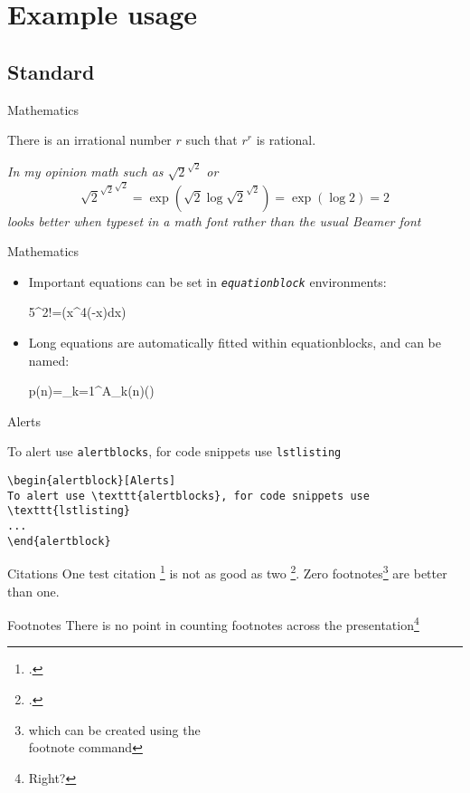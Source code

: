 \documentclass[12pt]{beamer}
\begin{document}
\section{Example usage}
\subsection{Standard}
\begin{frame}{Mathematics}
\begin{theorem}
There is an irrational number $r$ such that $r^r$ is rational.
\end{theorem}
\textit{In my opinion math such as $\sqrt{2}^{\sqrt{2}}$ or 
 $$
 {\sqrt{2}^{\sqrt{2}}}^{\sqrt{2}}=\exp(\sqrt{2}\log\sqrt{2}^{\sqrt{2}})=\exp(\log{2})=2
 $$ looks better when typeset in a math font rather than the usual Beamer font}\hfill\qedsymbol

\end{frame}
\begin{frame}{Mathematics}
\begin{itemize}
	\item Important equations can be set in \emph{\texttt{equationblock}} environments:
	\begin{equationblock}
		5^2!=\exp(\int x^4\exp(-x)\;dx)
	\end{equationblock}	
	\item Long equations are automatically fitted within equationblocks, and can be named:
	\begin{equationblock}
		p(n)=\sum_{k=1}^{\infty}A_{k}(n)\left(\sinh{}\right)
	\end{equationblock}
\end{itemize}
\end{frame}
\begin{frame}[fragile]{Alerts}
\begin{alertblock}[Alerts]
To alert use \texttt{alertblocks}, for code snippets use \texttt{lstlisting}
\begin{lstlisting}
\begin{alertblock}[Alerts]
To alert use \texttt{alertblocks}, for code snippets use \texttt{lstlisting}
...
\end{alertblock}
\end{lstlisting}

\end{alertblock}
\end{frame}
\begin{frame}{Citations}
One test citation \footcite{AdamsFournier2003} is not as good as two \footcite{AlexanderianPetraStadlerEtAl2016}. 
Zero footnotes\footnote{which can be created using the \\footnote command} are better than one.
\end{frame}
\begin{frame}{Footnotes}
	There is no point in counting footnotes across the presentation\footnote{Right?}
\end{frame}
	
\end{document}
